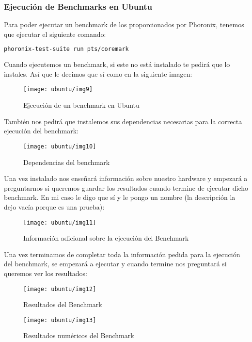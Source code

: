 \newpage
\subsubsection{Ejecución de Benchmarks en Ubuntu}

Para poder ejecutar un benchmark de los proporcionados por Phoronix, tenemos que ejecutar el siguiente comando:

\begin{lstlisting}[language=bash]
    phoronix-test-suite run pts/coremark
\end{lstlisting}

Cuando ejecutemos un benchmark, si este no está instalado te pedirá que lo instales. Así que le decimos que sí como en la siguiente imagen:

\begin{figure}[H]
    \centering
    \texttt{[image: ubuntu/img9]}
    \caption{Ejecución de un benchmark en Ubuntu}
\end{figure}

También nos pedirá que instalemos sus dependencias necesarias para la correcta ejecución del benchmark:

\begin{figure}[H]
    \centering
    \texttt{[image: ubuntu/img10]}
    \caption{Dependencias del benchmark}
\end{figure}
    
Una vez instalado nos enseñará información sobre nuestro hardware y empezará a preguntarnos si queremos guardar los resultados cuando termine de ejecutar dicho benchmark. En mi caso le digo que sí y le pongo un nombre (la descripción la dejo vacía porque es una prueba):

\begin{figure}[H]
    \centering
    \texttt{[image: ubuntu/img11]}
    \caption{Información adicional sobre la ejecución del Benchmark}
\end{figure}

Una vez terminamos de completar toda la información pedida para la ejecución del benchmark, se empezará a ejecutar y cuando termine nos preguntará si queremos ver los resultados:

\begin{figure}[H]
    \centering
    \texttt{[image: ubuntu/img12]}
    \caption{Resultados del Benchmark}
\end{figure}

\begin{figure}[H]
    \centering
    \texttt{[image: ubuntu/img13]}
    \caption{Resultados numéricos del Benchmark}
\end{figure}


